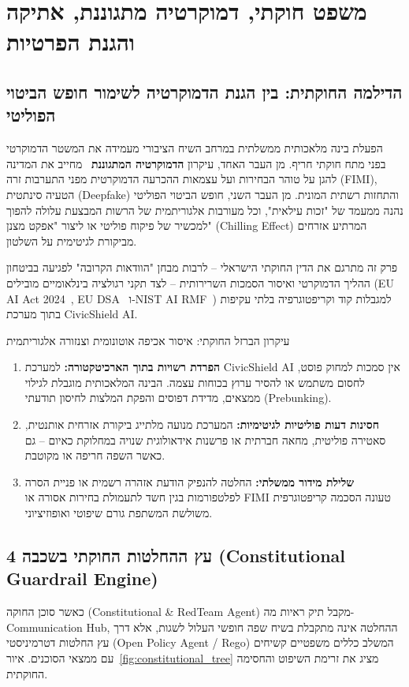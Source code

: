\chapter{משפט חוקתי, דמוקרטיה מתגוננת, אתיקה והגנת הפרטיות}
\label{ch:law}

\section{הדילמה החוקתית: בין הגנת הדמוקרטיה לשימור חופש הביטוי הפוליטי}
הפעלת בינה מלאכותית ממשלתית במרחב השיח הציבורי מעמידה את המשטר הדמוקרטי בפני מתח חוקתי חריף. מן העבר האחד, עיקרון \textbf{הדמוקרטיה המתגוננת}~\cite{loewenstein1937militant,barak1988defensive} מחייב את המדינה להגן על טוהר הבחירות ועל עצמאות ההכרעה הדמוקרטית מפני התערבות זרה (FIMI), הטעיה סינתטית (Deepfake) והתחזות רשתית המונית. מן העבר השני, חופש הביטוי הפוליטי נהנה ממעמד של "זכות עילאית", וכל מעורבות אלגוריתמית של הרשות המבצעת עלולה להפוך למכשיר של פיקוח פוליטי או ליצור "אפקט מצנן" (Chilling Effect) המרתיע אזרחים מביקורת לגיטימית על השלטון.

פרק זה מתרגם את הדין החוקתי הישראלי -- לרבות מבחן "הוודאות הקרובה" לפגיעה בביטחון ההליך הדמוקרטי ואיסור הסמכות השרירותית -- לצד תקני רגולציה בינלאומיים מובילים (EU AI Act 2024~\cite{eu2024aiact}, EU DSA~\cite{eu2022dsa} ו-NIST AI RMF~\cite{nist2023rmf}) למגבלות קוד וקריפטוגרפיה בלתי עקיפות בתוך מערכת CivicShield AI.

\begin{constitutionalbox}{עיקרון הברזל החוקתי: איסור אכיפה אוטונומית וצנזורה אלגוריתמית}
\begin{enumerate}
    \item \textbf{הפרדת רשויות בתוך הארכיטקטורה:} למערכת CivicShield AI אין סמכות למחוק פוסט, לחסום משתמש או להסיר ערוץ בכוחות עצמה. הבינה המלאכותית מוגבלת לגילוי ממצאים, מדידת דפוסים והפקת המלצות לחיסון תודעתי (Prebunking).
    \item \textbf{חסינות דעות פוליטיות לגיטימיות:} המערכת מנועה מלתייג ביקורת אזרחית אותנטית, סאטירה פוליטית, מחאה חברתית או פרשנות אידאולוגית שנויה במחלוקת כאיום -- גם כאשר השפה חריפה או מקוטבת.
    \item \textbf{שלילת מידור ממשלתי:} החלטה להנפיק הודעת אזהרה רשמית או פניית הסרה לפלטפורמות בגין חשד לתעמולת בחירות אסורה או FIMI טעונה הסכמה קריפטוגרפית משולשת המשתפת גורם שיפוטי ואופוזיציוני.
\end{enumerate}
\end{constitutionalbox}

\section{עץ ההחלטות החוקתי בשכבה 4 (Constitutional Guardrail Engine)}
כאשר סוכן החוקה (Constitutional \& RedTeam Agent) מקבל תיק ראיות מה-Communication Hub, ההחלטה אינה מתקבלת בשיח שפה חופשי העלול לשגות, אלא דרך עץ החלטות דטרמיניסטי (Open Policy Agent / Rego) המשלב כללים משפטיים קשיחים עם ממצאי הסוכנים. איור~\ref{fig:constitutional_tree} מציג את זרימת השיפוט והחסימה החוקתית.

